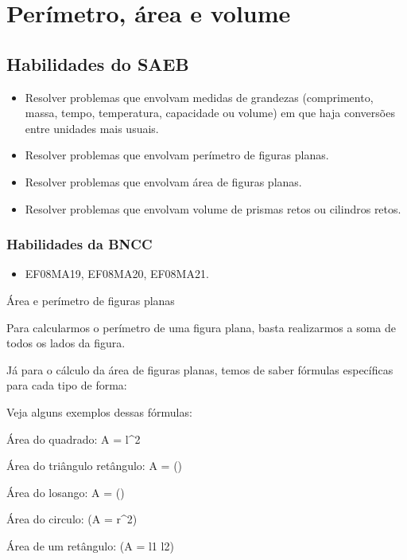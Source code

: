 

\chapter{Perímetro, área e
volume}

\section{Habilidades do SAEB}

\begin{itemize}
\item Resolver problemas que envolvam medidas de
grandezas (comprimento, massa, tempo, temperatura, capacidade ou volume)
em que haja conversões entre unidades mais usuais.
\item
  Resolver problemas que envolvam perímetro de figuras planas.
\item
  Resolver problemas que envolvam área de figuras planas.
\item
  Resolver problemas que envolvam volume de prismas retos ou cilindros
  retos.
\end{itemize}

\subsection{Habilidades da BNCC}

\begin{itemize}
\item EF08MA19, EF08MA20, EF08MA21.
\end{itemize}

Área e perímetro de figuras planas

Para calcularmos o perímetro de uma figura plana, basta realizarmos a
soma de todos os lados da figura.

Já para o cálculo da área de figuras planas, temos de saber fórmulas
específicas para cada tipo de forma:

Veja alguns exemplos dessas fórmulas:

Área do quadrado: A = l^2

Área do triângulo retângulo: A = ()

Área do losango: A = ()

Área do circulo: (A = \pi r^{2})

Área de um retângulo: (A = l1 \cdot l2)

